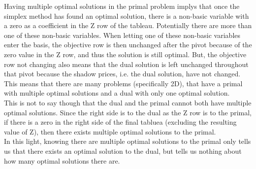 Having multiple optimal solutions in the primal problem implys that once the simplex method has found an optimal solution, there is a non-basic variable with a zero as a coefficient in the Z row of the tableau.  Potentially there are more than one of these non-basic variables.  When letting one of these non-basic variables enter the basis, the objective row is then unchanged after the pivot because of the zero value in the Z row, and thus the solution is still optimal.  But, the objective row not changing also means that the dual solution is left unchanged throughout that pivot because the shadow prices, i.e. the dual solution, have not changed.\\
This means that there are many problems (specifically 2D), that have a primal with multiple optimal solutions and a dual with only one optimal solution.\\
This is not to say though that the dual and the primal cannot both have multiple optimal solutions.  Since the right side is to the dual as the Z row is to the primal, if there is a zero in the right side of the final tabluea (excluding the resulting value of Z), then there exists multiple optimal solutions to the primal.\\
In this light, knowing there are multiple optimal solutions to the primal only tells us that there exists an optimal solution to the dual, but tells us nothing about how many optimal solutions there are.\\

